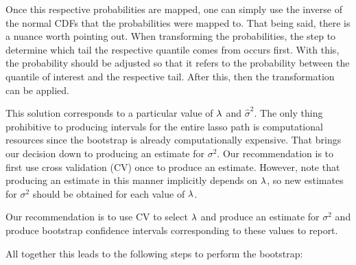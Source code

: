 Once this respective probabilities are mapped, one can simply use the inverse of the normal CDFs that the probabilities were mapped to. That being said, there is a nuance worth pointing out. When transforming the probabilities, the step to determine which tail the respective quantile comes from occurs first. With this, the probability should be adjusted so that it refers to the probability between the quantile of interest and the respective tail. After this, then the transformation can be applied. 


This solution corresponds to a particular value of $\lambda$ and $\hat{\sigma}^2$. The only thing prohibitive to producing intervals for the entire lasso path is computational resources since the bootstrap is already computationally expensive. That brings our decision down to producing an estimate for $\sigma^2$. Our recommendation is to first use cross validation (CV) once to produce an estimate. However, note that producing an estimate in this manner implicitly depends on $\lambda$, so new estimates for $\sigma^2$ should be obtained for each value of $\lambda$.


Our recommendation is to use CV to select $\lambda$ and produce an estimate for $\sigma^2$ and produce bootstrap confidence intervals corresponding to these values to report.


All together this leads to the following steps to perform the bootstrap:

